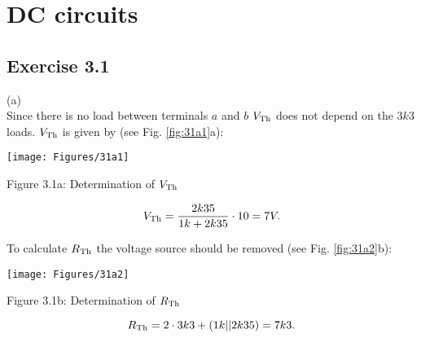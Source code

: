 \begin{comment}
\begin{titlepage}
\begin{center}
 \Huge \textbf{\textsc{Solutions}}\\[1cm]
 \Huge \textbf{\textsc{Electronics \& Signal Processing}}\\[1cm]
 \Huge \textbf{\textsc{Chapter 3}}\\[3cm]
 \LARGE M BMTP / BS P \& A \\[1cm]
\Large


\begin{figure}[b]
\center{\texttt{[image: Figures/logoVUvA]}}			
\end{figure}

\end{center}
\end{titlepage}
\end{comment}

\chapter{DC circuits}

\section{\textbf{Exercise 3.1}}
\noindent (a) \\
Since there is no load between terminals $a$ and $b$ $V_{\rm Th}$ does not depend on the $3k3$ loads. $V_{\rm Th}$ is given by (see Fig. \ref{fig:31a1}a):
\begin{center}
    \texttt{[image: Figures/31a1]} 

    Figure 3.1a: Determination of $V_{\rm Th}$	  
    \label{fig:31a1} 
\end{center} 


\begin{equation}
V_{\rm Th} = \frac{2k35}{1k + 2k35} \cdot 10 = 7 V.
\end{equation}

\newpage
\noindent To calculate $R_{\rm Th}$ the voltage source should be removed (see Fig. \ref{fig:31a2}b):
\begin{center}
    \texttt{[image: Figures/31a2]}	
    
    Figure 3.1b: Determination of $R_{\rm Th}$	  
\label{fig:31a2} 
\end{center}

\begin{equation}
R_{\rm Th} = 2 \cdot 3k3 + (1k || 2k35) = 7k3.
\end{equation}


